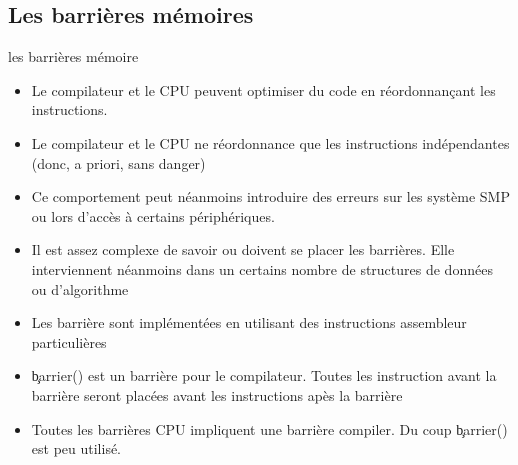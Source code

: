 \subsection{Les barrières mémoires}

\begin{frame}[fragile=singleslide]{les barrières mémoire}
  \begin{itemize}
  \item  Le  compilateur  et  le  CPU peuvent  optimiser  du  code  en
    réordonnançant les instructions.
  \item Le compilateur et le  CPU ne réordonnance que les instructions
    indépendantes (donc, a priori, sans danger)
  \item Ce comportement peut  néanmoins introduire des erreurs sur les
    système SMP ou lors d'accès à certains périphériques.
  \item  Il est  assez complexe  de savoir  ou doivent  se  placer les
    barrières. Elle interviennent néanmoins dans un certains nombre de
    structures de données ou d'algorithme
  \item Les  barrière sont implémentées en  utilisant des instructions
    assembleur particulières
  \item \c{barrier()} est un barrière pour le compilateur.  Toutes les
    instruction   avant   la  barrière   seront   placées  avant   les
    instructions apès la barrière
  \item Toutes les barrières  CPU impliquent une barrière compiler. Du
    coup \c{barrier()} est peu utilisé.
  \end{itemize}
\end{frame}

